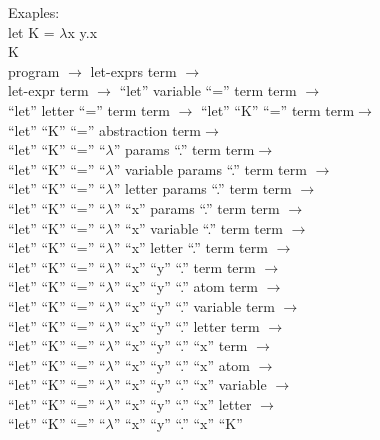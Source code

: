 \documentclass{article}
\begin{document}
Exaples:\\
let K = $\lambda$x y.x\\
K\\


program $\rightarrow$ let-exprs term $\rightarrow$\\
let-expr term $\rightarrow$ ``let'' variable ``='' term term $\rightarrow$\\
``let'' letter ``='' term term $\rightarrow$ ``let'' ``K'' ``='' term term$\rightarrow$\\
``let'' ``K'' ``='' abstraction term$\rightarrow$\\
``let'' ``K'' ``='' ``$\lambda$'' params ``.'' term term$\rightarrow$\\
``let'' ``K'' ``='' ``$\lambda$'' variable params  ``.'' term term $\rightarrow$\\
``let'' ``K'' ``='' ``$\lambda$'' letter params  ``.'' term term $\rightarrow$\\
``let'' ``K'' ``='' ``$\lambda$'' ``x'' params  ``.'' term term $\rightarrow$\\
``let'' ``K'' ``='' ``$\lambda$'' ``x'' variable  ``.'' term term $\rightarrow$\\
``let'' ``K'' ``='' ``$\lambda$'' ``x'' letter  ``.'' term term $\rightarrow$\\
``let'' ``K'' ``='' ``$\lambda$'' ``x'' ``y''  ``.'' term term $\rightarrow$\\
``let'' ``K'' ``='' ``$\lambda$'' ``x'' ``y''  ``.'' atom term $\rightarrow$\\
``let'' ``K'' ``='' ``$\lambda$'' ``x'' ``y''  ``.'' variable term $\rightarrow$\\
``let'' ``K'' ``='' ``$\lambda$'' ``x'' ``y''  ``.'' letter term $\rightarrow$\\
``let'' ``K'' ``='' ``$\lambda$'' ``x'' ``y''  ``.'' ``x'' term $\rightarrow$\\
``let'' ``K'' ``='' ``$\lambda$'' ``x'' ``y''  ``.'' ``x'' atom $\rightarrow$\\
``let'' ``K'' ``='' ``$\lambda$'' ``x'' ``y''  ``.'' ``x'' variable $\rightarrow$\\
``let'' ``K'' ``='' ``$\lambda$'' ``x'' ``y''  ``.'' ``x'' letter $\rightarrow$\\
``let'' ``K'' ``='' ``$\lambda$'' ``x'' ``y''  ``.'' ``x'' ``K''\\
\end{document}
